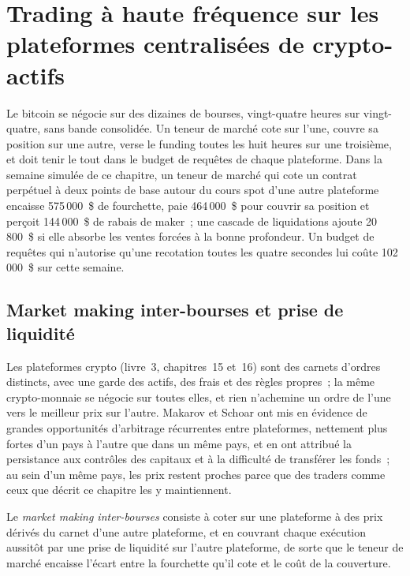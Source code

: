 \chapter{Trading à haute fréquence sur les plateformes centralisées de crypto-actifs}\label{ch:hf:crypto-high-frequency-trading-on-centralised-venues}

Le bitcoin se négocie sur des dizaines de bourses, vingt-quatre heures sur vingt-quatre, sans bande consolidée. Un teneur de marché cote sur l'une, couvre sa position sur une autre, verse le funding
toutes les huit heures sur une troisième, et doit tenir le tout dans le budget de requêtes de chaque plateforme. Dans la semaine simulée de ce chapitre, un teneur de marché qui cote un
contrat perpétuel à deux points de base autour du cours spot d'une autre plateforme encaisse 575\,000~\$ de fourchette, paie 464\,000~\$ pour couvrir sa position et perçoit 144\,000~\$ de
rabais de maker~; une cascade de liquidations ajoute 20\,800~\$ si elle absorbe les ventes forcées à la bonne profondeur. Un budget de requêtes qui n'autorise qu'une recotation toutes les
quatre secondes lui coûte 102\,000~\$ sur cette semaine.

\section{Market making inter-bourses et prise de liquidité}

Les plateformes crypto (livre~3, chapitres~15 et~16) sont des carnets d'ordres distincts, avec une garde des actifs, des frais et des règles propres~; la même crypto-monnaie se négocie sur toutes
elles, et rien n'achemine un ordre de l'une vers le meilleur prix sur l'autre. Makarov et Schoar ont mis en évidence de grandes opportunités d'arbitrage
récurrentes entre plateformes, nettement plus fortes d'un pays à l'autre que dans un même pays, et en ont attribué la persistance aux contrôles des capitaux et à la difficulté de transférer les
fonds~; au sein d'un même pays, les prix restent proches parce que des traders comme ceux que décrit ce chapitre les y maintiennent.

\begin{definition}\label{def:hf:crypto-high-frequency-trading-on-centralised-venues:xmm}
Le \emph{market making inter-bourses} consiste à coter sur une plateforme à des prix dérivés du carnet d'une autre plateforme, et
en couvrant chaque exécution aussitôt par une prise de liquidité sur l'autre plateforme, de sorte que le teneur de marché encaisse l'écart entre la fourchette qu'il cote et le coût de
la couverture.
\end{definition}

